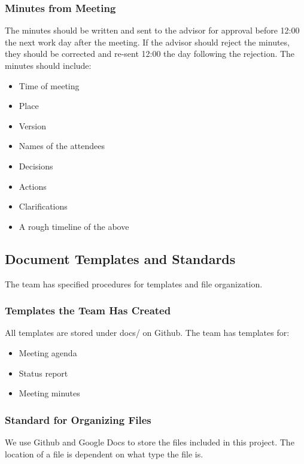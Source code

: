 \subsubsection{Minutes from Meeting}
The minutes should be written and sent to the advisor for approval before 12:00 the next work day after the meeting. If the advisor should reject the minutes, they should be corrected and re-sent 12:00 the day following the rejection. The minutes should include:
\begin{itemize}
	\item Time of meeting
	\item Place
	\item Version
	\item Names of the attendees
	\item Decisions
	\item Actions
	\item Clarifications
	\item A rough timeline of the above
\end{itemize}

\subsection{Document Templates and Standards}
The team has specified procedures for templates and file organization.

\subsubsection{Templates the Team Has Created}
All templates are stored under docs/ on Github. The team has templates for:

\begin{itemize}
	\item Meeting agenda
	\item Status report
	\item Meeting minutes
\end{itemize}

\subsubsection{Standard for Organizing Files}
We use Github and Google Docs to store the files included in this project. The
location of a file is dependent on what type the file is. 

